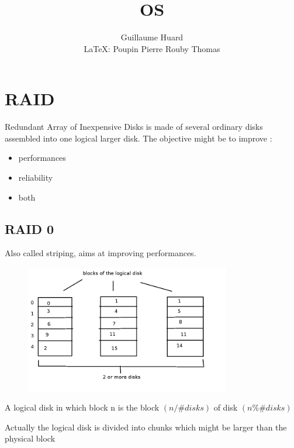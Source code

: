 \documentclass[a4paper,10pt]{report}
\title{OS}
\author{Guillaume Huard \\
	\LaTeX : Poupin Pierre Rouby Thomas
}
\date{}
\newlength{\larg}
\begin{document}
\maketitle


\section{RAID}

Redundant Array of Inexpensive Disks is made of several ordinary disks assembled into one logical larger disk. The objective might be to improve :
\begin{itemize}
  \item performances
  \item reliability
  \item both
\end{itemize}

\subsection{RAID 0}

Also called striping, aims at improving performances.
\begin{figure}[h!]
  \begin{center}
    \includegraphics[width=0.8\textwidth]{raid_0.png}
    \caption{}
  \end{center}
\end{figure}

A logical disk in which block n is the block $(n/\#disks)$ of disk $(n \% \#disks)$

Actually the logical disk is divided into chunks which might be larger than the physical block
\end{document}
